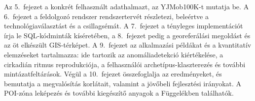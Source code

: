 Az 5.\ fejezet a konkrét felhasznált adathalmazt, az YJMob100K-t mutatja be. A 6.\ fejezet a feldolgozó rendszer rendszertervét részletezi, beleértve a technológiaválasztást és a csillagsémát. A 7.\ fejezet a tényleges implementációt írja le SQL-kódminták kíséretében, a 8.\ fejezet pedig a georeferálási megoldást és az öt elkészült GIS-térképet. A 9.\ fejezet az alkalmazási példákat és a kvantitatív elemzéseket tartalmazza: ide tartozik az anomáliadetekció kiértékelése, a cirkadián ritmus reprodukciója, a felhasználói archetípus-klaszterezés és további mintázatfeltárások. Végül a 10.\ fejezet összefoglalja az eredményeket, és bemutatja a megvalósítás korlátait, valamint a jövőbeli fejlesztési irányokat. A POI-zóna leképezés és további kiegészítő anyagok a Függelékben találhatók.
